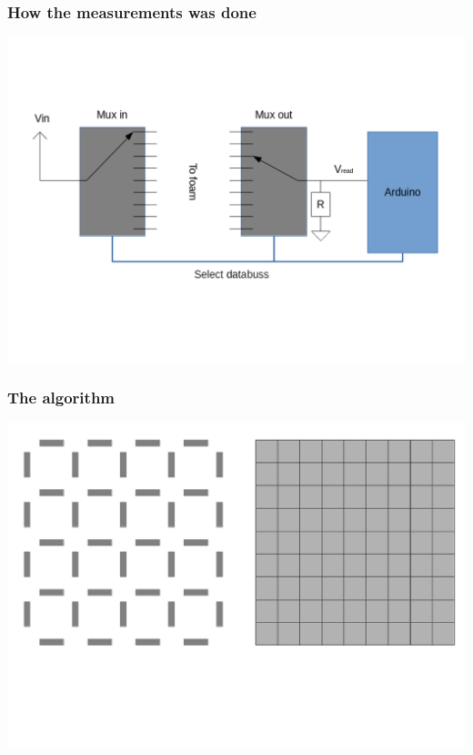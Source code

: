 \documentclass{beamer}
\begin{document}
\begin{frame}
    \frametitle{How the measurements was done}
    \begin{center}
        \includegraphics[width=.8\textwidth]{img/arduino_foam.png}
    \end{center}
\end{frame}

\begin{frame}
    \frametitle{The algorithm}
    \begin{center}
        \includegraphics[width=\textwidth]{img/grid0.png}
    \end{center}
\end{frame}
\end{document}

